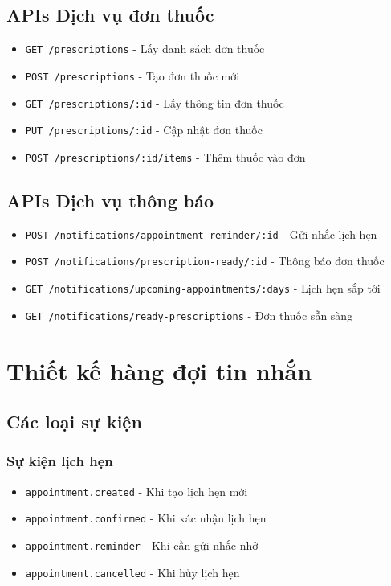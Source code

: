 \documentclass[12pt,a4paper]{report}
\begin{document}
\subsection{APIs Dịch vụ đơn thuốc}
\begin{itemize}
    \item \texttt{GET /prescriptions} - Lấy danh sách đơn thuốc
    \item \texttt{POST /prescriptions} - Tạo đơn thuốc mới
    \item \texttt{GET /prescriptions/:id} - Lấy thông tin đơn thuốc
    \item \texttt{PUT /prescriptions/:id} - Cập nhật đơn thuốc
    \item \texttt{POST /prescriptions/:id/items} - Thêm thuốc vào đơn
\end{itemize}

\subsection{APIs Dịch vụ thông báo}
\begin{itemize}
    \item \texttt{POST /notifications/appointment-reminder/:id} - Gửi nhắc lịch hẹn
    \item \texttt{POST /notifications/prescription-ready/:id} - Thông báo đơn thuốc
    \item \texttt{GET /notifications/upcoming-appointments/:days} - Lịch hẹn sắp tới
    \item \texttt{GET /notifications/ready-prescriptions} - Đơn thuốc sẵn sàng
\end{itemize}

\section{Thiết kế hàng đợi tin nhắn}

\subsection{Các loại sự kiện}
\subsubsection{Sự kiện lịch hẹn}
\begin{itemize}
    \item \texttt{appointment.created} - Khi tạo lịch hẹn mới
    \item \texttt{appointment.confirmed} - Khi xác nhận lịch hẹn
    \item \texttt{appointment.reminder} - Khi cần gửi nhắc nhở
    \item \texttt{appointment.cancelled} - Khi hủy lịch hẹn
\end{itemize}
\end{document}
